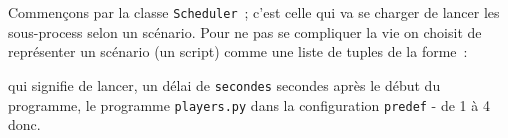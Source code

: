     Commençons par la classe \texttt{Scheduler}~; c'est celle qui va se
charger de lancer les sous-process selon un scénario. Pour ne pas se
compliquer la vie on choisit de représenter un scénario (un script)
comme une liste de tuples de la forme~:

\begin{Shaded}
\begin{Highlighting}[frame=lines,framerule=0.6mm,rulecolor=\color{asisframecolor}]
\OperatorTok{=}
\end{Highlighting}
\end{Shaded}

qui signifie de lancer, un délai de \texttt{secondes} secondes après le
début du programme, le programme \texttt{players.py} dans la
configuration \texttt{predef} - de 1 à 4 donc.

